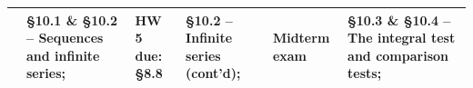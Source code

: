 \documentclass[11pt]{article}
\begin{document}
\begin{table}[ht!]
{\begin{tabular}{ | l | l | l | l | l | l |}
 & \begin{minipage}{0.18\textwidth}
\S 10.1 \& \S10.2 -- Sequences and infinite series;
\end{minipage}
& \begin{minipage}{.18\textwidth}
HW 5 due: \S 8.8
\end{minipage}
& \begin{minipage}{.18\textwidth}
\S 10.2 -- Infinite series (cont'd); 
\end{minipage}
& \begin{minipage}{.18\textwidth}
Midterm exam
\end{minipage}
& \begin{minipage}{.18\textwidth}
\S 10.3 \& \S10.4 -- The integral test and comparison tests;
\end{minipage}\\
\hline

\end{tabular} 
}
\end{table}
\end{document}
